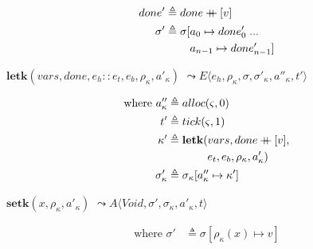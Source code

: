 \documentclass[12pt,draft]{article}
\newcommand\mdoubleplus{\ensuremath{\mathbin{+\mkern-9mu+}}}
\begin{document}
\begin{multicols*}{2}
\begin{align*}
  done' &\triangleq done \mdoubleplus [v] \\
  \sigma' &\triangleq \sigma[a_0 \mapsto done'_0\;...\\
                    &\;\;\;\;\;\;\;\;a_{n-1} \mapsto done'_{n-1}]
\end{align*}
\begin{center}
  $\textbf{letk}(vars, done, e_h::e_t , e_b , \rho_\kappa, a'_\kappa)$
  $\leadsto E\langle e_h , \rho_\kappa , \sigma , \sigma'_\kappa , a''_\kappa , t' \rangle$
\end{center}
\vspace{-7mm}
\begin{align*}
  \text{where }
  a''_\kappa &\triangleq alloc(\varsigma, 0) \\
  t' &\triangleq tick(\varsigma, 1) \\
  \kappa' &\triangleq \textbf{letk}(vars, done \mdoubleplus [v], \\
             &\;\;\;\;\;\;\;\;\;\;\;\;\;e_t, e_b, \rho_\kappa, a'_\kappa) \\
  \sigma'_\kappa &\triangleq \sigma_\kappa[a''_\kappa \mapsto \kappa']
\end{align*}
\begin{center}
  $\textbf{setk}(x, \rho_\kappa, a'_\kappa)$
  $\leadsto A\langle \textit{Void} , \sigma' , \sigma_\kappa , a'_\kappa , t \rangle$
\end{center}
\vspace{-7mm}
\begin{align*}
  \text{where } \sigma' &\triangleq \sigma[\rho_{\kappa}(x) \mapsto v]
\end{align*}

\vfill\null
\columnbreak



\end{multicols*}
\end{document}

